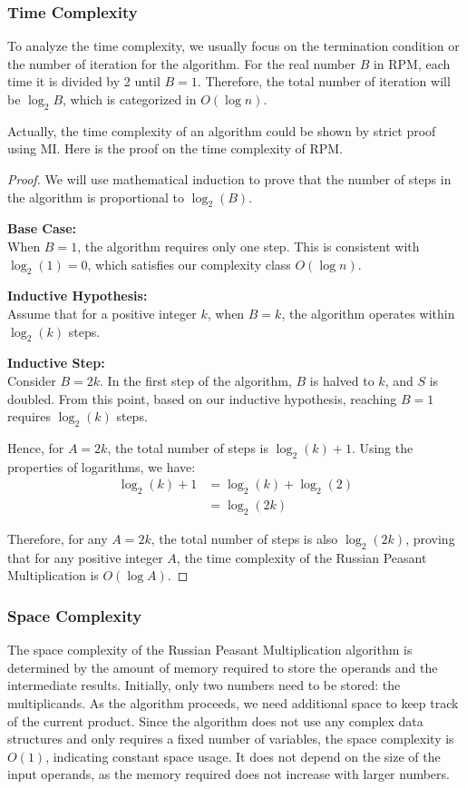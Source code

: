\subsubsection{Time Complexity}
To analyze the time complexity, we usually focus on the termination condition or the number of iteration for the algorithm. For the real number $B$ in RPM, each time it is divided by 2 until $B = 1$. Therefore, the total number of iteration will be $\log_2 B$, which is categorized in \( O(\log n) \).
\begin{remark}
    Actually, the time complexity of an algorithm could be shown by strict proof using MI. Here is the proof on the time complexity of RPM.
    \begin{proof}
        We will use mathematical induction to prove that the number of steps in the algorithm is proportional to \( \log_2(B) \).

\noindent \textbf{Base Case:}\\
When \( B = 1 \), the algorithm requires only one step. This is consistent with \( \log_2(1) = 0 \), which satisfies our complexity class \( O(\log n) \).

\noindent \textbf{Inductive Hypothesis:}\\
Assume that for a positive integer \( k \), when \( B = k \), the algorithm operates within \( \log_2(k) \) steps.

\noindent \textbf{Inductive Step:}\\
Consider \( B = 2k \). In the first step of the algorithm, \( B \) is halved to \( k \), and \( S \) is doubled. From this point, based on our inductive hypothesis, reaching \( B = 1 \) requires \( \log_2(k) \) steps.

Hence, for \( A = 2k \), the total number of steps is \( \log_2(k) + 1 \). Using the properties of logarithms, we have:
\begin{align*}
\log_2(k) + 1 &= \log_2(k) + \log_2(2) \\
&= \log_2(2k)
\end{align*}

Therefore, for any \( A = 2k \), the total number of steps is also \( \log_2(2k) \), proving that for any positive integer \( A \), the time complexity of the Russian Peasant Multiplication is \( O(\log A) \).
    \end{proof}
\end{remark}
\subsubsection{Space Complexity}
The space complexity of the Russian Peasant Multiplication algorithm is determined by the amount of memory required to store the operands and the intermediate results. Initially, only two numbers need to be stored: the multiplicands. As the algorithm proceeds, we need additional space to keep track of the current product. Since the algorithm does not use any complex data structures and only requires a fixed number of variables, the space complexity is \( O(1) \), indicating constant space usage. It does not depend on the size of the input operands, as the memory required does not increase with larger numbers.
